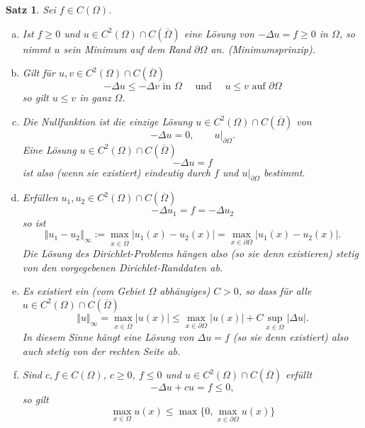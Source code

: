 \documentclass[
]{mycourse}
\theoremstyle{mythm}
\newtheorem{theorem}{Satz}[chapter]
\theoremstyle{break}
\newcommand{\norm}[1]{\left\Vert#1\right\Vert}		%
\begin{document}
\begin{theorem}\label{thm:MaxPrinzipFolgerungen}
Sei $f\in C(\Omega)$. 
\begin{enumerate}[(a)]
\item Ist $f\geq 0$ und $u\in C^2(\Omega)\cap C(\overline\Omega)$ eine Lösung von 
$-\Delta u=f\geq 0$ in $\Omega$, so nimmt $u$ sein Minimum auf dem
Rand $\partial \Omega$ an. (\emph{Minimumsprinzip}).
%
\item Gilt für $u,v\in C^2(\Omega)\cap C(\overline\Omega)$
\[
-\Delta u\leq -\Delta v \mbox{ in $\Omega$} \quad \mbox{ und } \quad u\leq v \mbox{ auf $\partial \Omega$}
\]
so gilt $u\leq v$ in ganz $\Omega$.
%
\item Die Nullfunktion ist die einzige Lösung $u\in C^2(\Omega)\cap C(\overline\Omega)$ von \[
-\Delta u=0, \qquad u|_{\partial \Omega}.
\]
Eine Lösung $u\in C^2(\Omega)\cap C(\overline\Omega)$ 
\[
-\Delta u=f
\]
ist also (wenn sie existiert) eindeutig durch $f$ und $u|_{\partial \Omega}$ bestimmt.
%
\item Erfüllen $u_1,u_2\in C^2(\Omega)\cap C(\overline\Omega)$ 
\[
-\Delta u_1=f= -\Delta u_2
\]
so ist 
\[
\norm{u_1-u_2}_\infty:=\max_{x\in \overline{\Omega}}|u_1(x)-u_2(x)|=\max_{x\in \partial \Omega}|u_1(x)-u_2(x)|.
\]
Die Lösung des Dirichlet-Problems hängen also (so sie denn existieren) stetig von den vorgegebenen Dirichlet-Randdaten ab.
%
\item Es existiert ein (vom Gebiet $\Omega$ abhängiges) $C>0$, so dass für alle $u\in C^2(\Omega)\cap C(\overline\Omega)$ 
\[
\norm{u}_\infty=\max_{x\in \overline\Omega} |u(x)|\leq \max_{x\in \partial \Omega} |u(x)|+C\sup_{x\in \Omega} |\Delta u|.
\]
In diesem Sinne hängt eine Lösung von $\Delta u=f$ (so sie denn existiert) also auch stetig von der rechten Seite ab.
%
\item Sind $c,f\in C(\Omega)$, $c\geq 0$, $f\leq 0$ und $u\in C^2(\Omega)\cap C(\overline\Omega)$ erfüllt
\[
-\Delta u + cu =f \leq 0,
\]
so gilt
\[
\max_{x\in \Omega}{u(x)} \leq \max\{0,\max_{x\in \partial \Omega}{u(x)}\}
\]

\end{enumerate}
\end{theorem}
\end{document}
